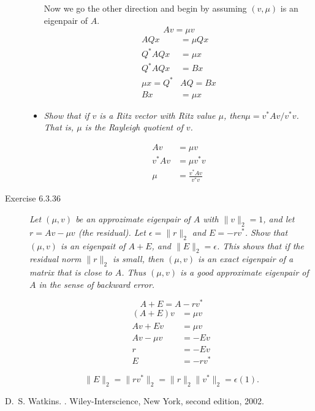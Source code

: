 \documentclass[10pt]{article}
\begin{document}
\begin{description}
\begin{itemize}[\textbf{Part }\bfseries a)]
    Now we go the other direction and begin by assuming $(v,\mu)$ is an eigenpair of $A$.
    \begin{equation}
        Av = \mu v
    \end{equation}
    \begin{subequations}\begin{align}
        AQx &= \mu Qx \\
        Q^*AQx &= \mu x \\
        Q^*AQx &= Bx \\
        \mu x = Q^*&AQ = Bx \\[4mm]
        Bx &= \mu x
    \end{align}\end{subequations}

    \item \emph{Show that if $v$ is a Ritz vector with Ritz value $\mu$, then$\mu = v^*Av/v^*v$.  That is, $\mu$ is the Rayleigh quotient of $v$.}

    \begin{subequations}\begin{align}
        Av &= \mu v \\
        v^*Av &= \mu v^*v \\[4mm]
        \mu &= \frac{v^*Av}{v^*v}
    \end{align}\end{subequations}
    \end{itemize}

    \item[Exercise 6.3.36] \emph{Let $(\mu, v)$ be an approzimate eigenpair of $A$ with $\|v\|_2 = 1$, and let $r = Av - \mu v$ (the residual).  Let $\epsilon = \|r\|_2$ and $E = -rv^*$.  Show that $(\mu, v)$ is an eigenpait of $A + E$, and $\|E\|_2 = \epsilon$.  This shows that if the residual norm $\|r\|_2$ is small, then $(\mu,v)$ is an exact eigenpair of a matrix that is close to $A$.  Thus $(\mu, v)$ is a good approximate eigenpair of $A$ in the sense of backward error.}

    \begin{equation}
        A + E = A - rv^*
    \end{equation}
    \begin{subequations}\begin{align}
        (A + E)v &= \mu v \\
        Av + Ev &= \mu v \\
        Av - \mu v &= -Ev \\
        r &= -Ev \\[4mm]
        E &= -rv^*
    \end{align}\end{subequations}

    \begin{equation}
        \|E\|_2 = \|rv^*\|_2 = \|r\|_2\|v^*\|_2 = \epsilon (1).
    \end{equation}

\end{description}

\begin{thebibliography}{10}
D.~S. Watkins.
.
\newblock Wiley-Interscience, New York, second edition, 2002.
\end{thebibliography}
\end{document}
